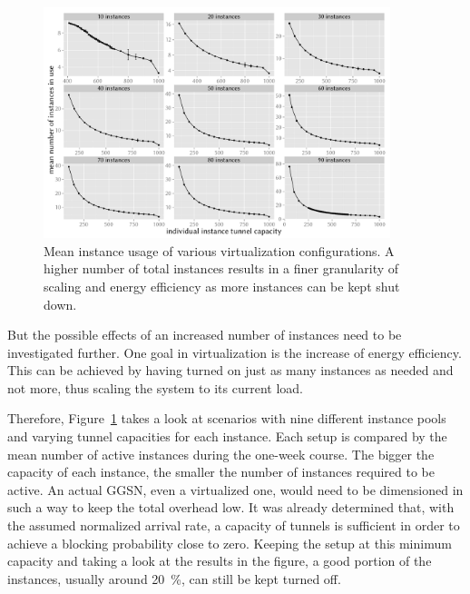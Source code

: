 \begin{figure}[htb]
	\centering
	\includegraphics[width=0.9\textwidth]{images/R-virtualized-mean-instanceusage.pdf}
	\caption{Mean instance usage of various virtualization configurations. A higher number of total instances results in a finer granularity of scaling and energy efficiency as more instances can be kept shut down.}
\label{c4:fig:res-instance-usage-mean}
\end{figure}

But the possible effects of an increased number of instances need to be investigated further. One goal in virtualization is the increase of energy efficiency. This can be achieved by having turned on just as many instances as needed and not more, thus scaling the system to its current load. 

Therefore, Figure~\ref{c4:fig:res-instance-usage-mean} takes a look at scenarios with nine different instance pools and varying tunnel capacities for each instance. Each setup is compared by the mean number of active instances during the one-week course. The bigger the capacity of each instance, the smaller the number of instances required to be active. An actual \gls{GGSN}, even a virtualized one, would need to be dimensioned in such a way to keep the total overhead low. It was already determined that, with the assumed normalized arrival rate, a capacity of  tunnels is sufficient in order to achieve a blocking probability close to zero. Keeping the setup at this minimum capacity and taking a look at the results in the figure, a good portion of the instances, usually around \SI{20}{\percent}, can still be kept turned off.

